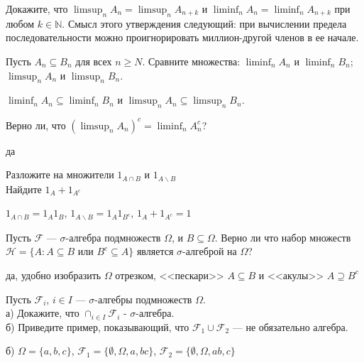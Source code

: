 \begin{problem}
Докажите, что $\limsup_{n}A_{n}=\limsup_{n}A_{n+k}$ и
$\liminf_{n}A_{n}=\liminf_{n}A_{n+k}$ при любом $k\in\mathbb{N}$.
Смысл этого утверждения следующий: при вычислении предела
последовательности можно проигнорировать миллион-другой членов в
ее начале. 
\end{problem} 
\begin{solution} 

\end{solution}

\begin{problem}
Пусть $A_{n} \subseteq B_{n}$ для всех $n\ge N$. Сравните множества: $\liminf_{n}A_{n}$ и $\liminf_{n}B_{n}$;
$\limsup_{n}A_{n}$ и $\limsup_{n}B_{n}$. 
\end{problem} 
\begin{solution} 
$\liminf_{n}A_{n} \subseteq \liminf_{n}B_{n}$ и $\limsup_{n}A_{n}
\subseteq \limsup_{n}B_{n}$.
\end{solution}

\begin{problem}
Верно ли, что $\left(\limsup_{n}A_{n}\right)^{c}=\liminf_{n}A_{n}^{c}$? 
\end{problem} 
\begin{solution} 
да
\end{solution}

\begin{problem}
Разложите на множители $1_{A\cap B}$ и $1_{A\backslash B}$ \\
Найдите $1_{A}+1_{A^{c}}$ 
\end{problem} 
\begin{solution} 
 $1_{A\cap B}=1_{A}1_{B}$, $1_{A\backslash B}=1_{A}1_{B^{c}}$, $1_{A}+1_{A^{c}}=1$
\end{solution}

\begin{problem}
Пусть $\mathcal{F}$ --- $\sigma$-алгебра подмножеств $\Omega$, и
$B\subseteq\Omega$. Верно ли что набор множеств
$\mathcal{H}=\{A:A\subseteq B$ или $B^{c}\subseteq A\}$ является
$\sigma$-алгеброй на $\Omega$? 
\end{problem} 
\begin{solution} 
да, удобно изобразить $\Omega$ отрезком, <<пескари>> $A\subseteq B$ и <<акулы>> $A \supseteq B^{c}$ 
\end{solution}

\begin{problem}
Пусть $\mathcal{F}_{i}$, $i\in I$ --- $\sigma$-алгебры подмножеств
$\Omega$. \\
а) Докажите, что $\cap_{i\in I}\mathcal{F}_{i}$ -
$\sigma$-алгебра. \\
б) Приведите пример, показывающий, что
$\mathcal{F}_{1}\cup\mathcal{F}_{2}$ --- не обязательно алгебра. 
\end{problem} 
\begin{solution} 
 б) $\Omega=\{a,b,c\}$, $\mathcal{F}_{1}=\{\emptyset,\Omega,a,bc\}$, $\mathcal{F}_{2}=\{\emptyset,\Omega,ab,c\}$
\end{solution}


